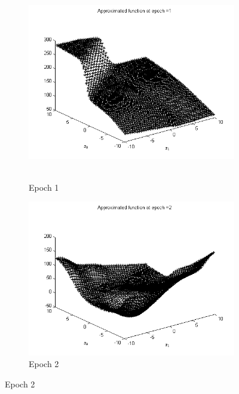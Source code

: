 \documentclass{article}
\begin{document}
\begin{figure}
\begin{subfigure}{.5\textwidth}
  \centering
  \includegraphics[width=.8\linewidth]{Regression/bivariate/1layer_epoch_1.png}\
  \caption{Epoch 1}
\end{subfigure}%
\begin{subfigure}{.5\textwidth}
  \centering
  \includegraphics[width=.8\linewidth]{Regression/bivariate/1layer_epoch_2.png}
   \caption{Epoch 2}
  \end{subfigure}
  

\end{figure}
\end{document}
